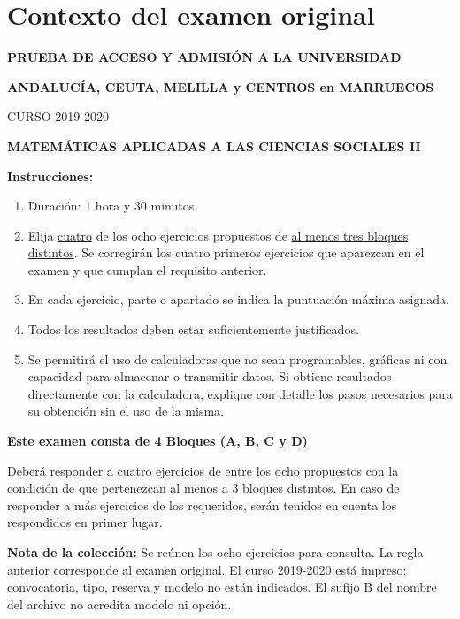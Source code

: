 \section*{Contexto del examen original}
\textbf{PRUEBA DE ACCESO Y ADMISIÓN A LA UNIVERSIDAD}\par
\textbf{ANDALUCÍA, CEUTA, MELILLA y CENTROS en MARRUECOS}\par
CURSO 2019-2020\par
\textbf{MATEMÁTICAS APLICADAS A LAS CIENCIAS SOCIALES II}

\textbf{Instrucciones:}
\begin{enumerate}[label=\textbf{\alph*)}]
  \item Duración: 1 hora y 30 minutos.
  \item Elija \underline{cuatro} de los ocho ejercicios propuestos de
  \underline{al menos tres bloques distintos}. Se corregirán los cuatro
  primeros ejercicios que aparezcan en el examen y que cumplan el requisito
  anterior.
  \item En cada ejercicio, parte o apartado se indica la puntuación máxima
  asignada.
  \item Todos los resultados deben estar suficientemente justificados.
  \item Se permitirá el uso de calculadoras que no sean programables,
  gráficas ni con capacidad para almacenar o transmitir datos. Si obtiene
  resultados directamente con la calculadora, explique con detalle los pasos
  necesarios para su obtención sin el uso de la misma.
\end{enumerate}
\textbf{\underline{Este examen consta de 4 Bloques (A, B, C y D)}}\par
Deberá responder a cuatro ejercicios de entre los ocho propuestos con la
condición de que pertenezcan al menos a 3 bloques distintos. En caso de
responder a más ejercicios de los requeridos, serán tenidos en cuenta los
respondidos en primer lugar.

\noindent\textbf{Nota de la colección:} Se reúnen los ocho ejercicios para
consulta. La regla anterior corresponde al examen original. El curso
2019-2020 está impreso; convocatoria, tipo, reserva y modelo no están indicados.
El sufijo B del nombre del archivo no acredita modelo ni opción.
\par\medskip

